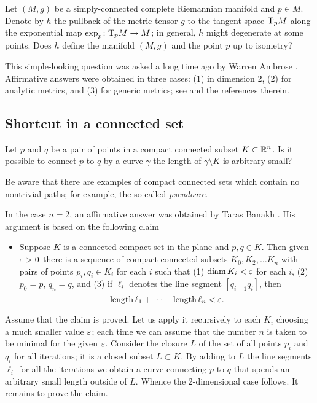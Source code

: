\begin{pr}
Let $(M,g)$ be a simply-connected complete Riemannian manifold and $p\in M$.
Denote by $h$ the pullback of the metric tensor $g$ to the tangent space $\mathrm{T}_pM$ along the exponential map $\exp_p\:\T_pM\z\to M$;
in general, $h$ might degenerate at some points.
Does $h$ define the manifold $(M,g)$ and the point $p$ up to isometry? 
\end{pr}

This simple-looking question was asked a long time ago by Warren Ambrose \cite{ambrose}.
Affirmative answers were obtained in three cases: (1) in dimension 2, (2) for analytic metrics, and (3) for generic metrics; see \cite{hebla, itoh, ardoy} and the references therein.


\subsection*{Shortcut in a connected set}

\begin{pr}
Let $p$ and $q$ be a pair of points in a compact connected subset $K\subset \mathbb{R}^n$.
Is it possible to connect $p$ to $q$ by a curve $\gamma$ the length of $\gamma\setminus K$ is arbitrary small?
\end{pr}

Be aware that there are examples of compact connected sets which contain no nontrivial paths; for example, the so-called \emph{pseudoarc}.

In the case $n=2$, an affirmative answer was obtained by Taras Banakh \cite{banakh}.
His argument is based on the following claim

\begin{itemize}
 \item Suppose $K$ is a connected compact set in the plane and $p,q\in K$.
 Then given $\varepsilon>0$ there is a sequence of compact connected subsets $K_0,K_2,\dots K_n$
 with pairs of points $p_i,q_i\in K_i$ for each $i$ such that 
(1) $\operatorname{\rm diam}\nolimits K_i<\varepsilon$ for each $i$,
(2) $p_0=p$, $q_n=q$, and (3) if $\ell_i$ denotes the line segment $[q_{i-1}q_i]$, then 
 \[\operatorname{\rm length} \ell_1+\dots+\operatorname{\rm length} \ell_n<\varepsilon.\]
\end{itemize}

Assume that the claim is proved.
Let us apply it recursively to each $K_i$ choosing a much smaller value $\varepsilon$; each time we can assume that the number $n$ is taken to be minimal for the given $\varepsilon$.
Consider the closure $L$ of the set of all points $p_i$ and $q_i$ for all iterations; it is a closed subset $L\subset K$.
By adding to $L$ the line segments $\ell_i$ for all the iterations we obtain a curve connecting $p$ to $q$ that spends an arbitrary small length outside of $L$.
Whence the 2-dimensional case follows.
It remains to prove the claim.

